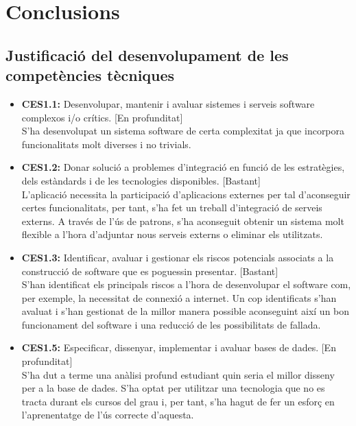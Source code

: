 
\chapter{Conclusions} %

\label{Conclusions} %

\section{Justificació del desenvolupament de les competències tècniques}

\begin{itemize}
\item{}\textbf{CES1.1:} Desenvolupar, mantenir i avaluar sistemes i serveis software complexos i/o crítics. [En profunditat]\\
S'ha desenvolupat un sistema software de certa complexitat ja que incorpora funcionalitats molt diverses i no trivials.
\item{}\textbf{CES1.2:} Donar solució a problemes d'integració en funció de les estratègies, dels estàndards i de les tecnologies disponibles. [Bastant]\\
L'aplicació necessita la participació d'aplicacions externes per tal d'aconseguir certes funcionalitats, per tant, s'ha fet un treball d'integració de
serveis externs. A través de l'ús de patrons, s'ha aconseguit obtenir un
sistema molt flexible a l'hora d'adjuntar nous serveis externs o eliminar
els utilitzats.
\item{}\textbf{CES1.3:} Identificar, avaluar i gestionar els riscos potencials associats a la
construcció de software que es poguessin presentar. [Bastant]\\
S'han identificat els principals riscos a l'hora de desenvolupar el software
com, per exemple, la necessitat de connexió a internet. Un cop identificats
s'han avaluat i s'han gestionat de la millor manera possible aconseguint
així un bon funcionament del software i una reducció de les possibilitats
de fallada.
\item{}\textbf{CES1.5:} Especificar, dissenyar, implementar i avaluar bases de dades. [En profunditat]\\
S'ha dut a terme una anàlisi profund estudiant quin seria el millor disseny
per a la base de dades. S'ha optat per utilitzar una tecnologia que no es
tracta durant els cursos del grau i, per tant, s'ha hagut de fer un esforç en l'aprenentatge de l'ús correcte d'aquesta.

\end{itemize}
